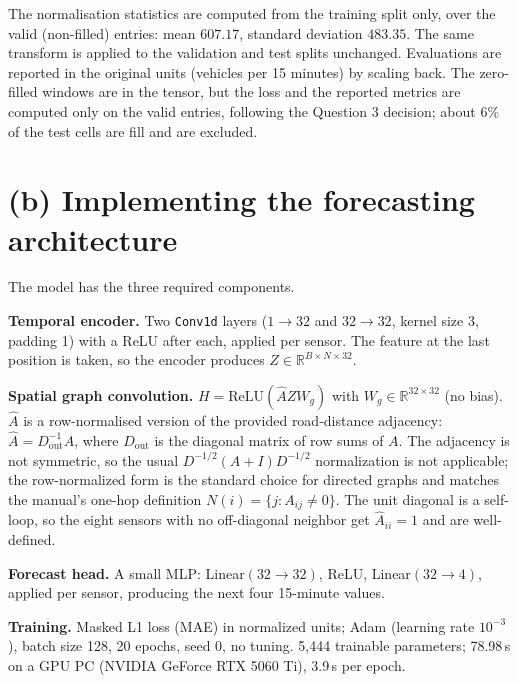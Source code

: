 \documentclass[11pt,letterpaper]{article}
\begin{document}
The normalisation statistics are computed from the training split only, over the valid
(non-filled) entries: mean $607.17$, standard deviation $483.35$. The same transform is
applied to the validation and test splits unchanged. Evaluations are reported in the
original units (vehicles per 15 minutes) by scaling back. The zero-filled windows are in
the tensor, but the loss and the reported metrics are computed only on the valid entries,
following the Question 3 decision; about $6\%$ of the test cells are fill and are excluded.

\section*{(b) Implementing the forecasting architecture}

The model has the three required components.

\textbf{Temporal encoder.} Two \texttt{Conv1d} layers ($1 \to 32$ and $32 \to 32$, kernel
size 3, padding 1) with a ReLU after each, applied per sensor. The feature at the last
position is taken, so the encoder produces $Z \in \mathbb{R}^{B \times N \times 32}$.

\textbf{Spatial graph convolution.} $H = \mathrm{ReLU}(\hat{A} Z W_g)$ with $W_g \in
\mathbb{R}^{32 \times 32}$ (no bias). $\hat{A}$ is a row-normalised version of the provided
road-distance adjacency: $\hat{A} = D_{\mathrm{out}}^{-1} A$, where $D_{\mathrm{out}}$ is
the diagonal matrix of row sums of $A$. The adjacency is not symmetric, so the usual
$D^{-1/2}(A+I)D^{-1/2}$ normalization is not applicable; the row-normalized form is the
standard choice for directed graphs and matches the manual's one-hop definition
$N(i) = \{j : A_{ij} \neq 0\}$. The unit diagonal is a self-loop, so the eight sensors with
no off-diagonal neighbor get $\hat{A}_{ii} = 1$ and are well-defined.

\textbf{Forecast head.} A small MLP: Linear$(32 \to 32)$, ReLU, Linear$(32 \to 4)$, applied
per sensor, producing the next four 15-minute values.

\textbf{Training.} Masked L1 loss (MAE) in normalized units; Adam (learning rate $10^{-3}$),
batch size 128, 20 epochs, seed 0, no tuning. 5{,}444 trainable parameters; 78.98\,s on a GPU PC (NVIDIA GeForce RTX 5060 Ti), 3.9\,s per epoch.
\end{document}
